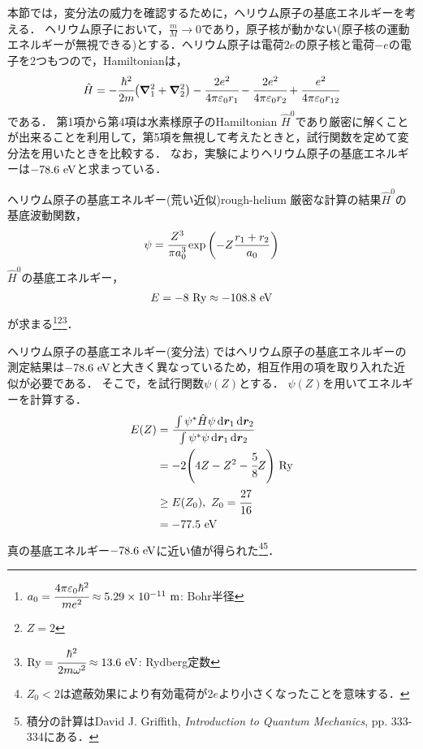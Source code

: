 \documentclass{report}
\begin{document}
  本節では，変分法の威力を確認するために，ヘリウム原子の基底エネルギーを考える．
  ヘリウム原子において，$\frac{m}{M}\to 0$であり，原子核が動かない(原子核の運動エネルギーが無視できる)とする．ヘリウム原子は電荷$2e$の原子核と電荷$-e$の電子を2つもつので，Hamiltonianは，
    \begin{align}
      \hat{H} = -\cfrac{\hbar^2}{2m}\qty(\grad_{1}^{2} + \grad_{2}^{2}) - \cfrac{2e^2}{4\pi \varepsilon_0 r_1}-\cfrac{2e^2}{4\pi \varepsilon_0 r_2} + \cfrac{e^2}{4\pi \varepsilon_0 r_{12}}
    \end{align}
    である．
    第1項から第4項は水素様原子のHamiltonian $\hat{H}^0$であり厳密に解くことが出来ることを利用して，第5項を無視して考えたときと，試行関数を定めて変分法を用いたときを比較する．
    なお，実験によりヘリウム原子の基底エネルギーは$-78.6\ \r{eV}$と求まっている．
  \begin{myex}{ヘリウム原子の基底エネルギー(荒い近似)}{rough-helium}
    厳密な計算の結果$\hat{H}^0$の基底波動関数，
    \begin{align}
      \psi = \cfrac{Z^3}{\pi a_0^3}\exp\qty(-Z\frac{r_1 + r_2}{a_0})\label{helium}
    \end{align}
    $\hat{H}^0$の基底エネルギー，
    \begin{align}
      E = -8\ \mathrm{Ry}\approx -108.8\ \mathrm{eV}
    \end{align}
    が求まる\footnote{
      $a_0 = \cfrac{4\pi\epsilon_0\hbar^2}{me^2} \approx 5.29\times 10^{-11}\ \r{m}$: Bohr半径
    }\footnote{
      $Z = 2$
    }\footnote{
      $\mathrm{Ry} = \cfrac{\hbar^2}{2m\omega^2} \approx 13.6 \ \mathrm{eV}$: Rydberg定数
    }．
  \end{myex}
  \begin{myex}{ヘリウム原子の基底エネルギー(変分法)}{}
    ではヘリウム原子の基底エネルギーの測定結果は$-78.6\ \r{eV}$と大きく異なっているため，相互作用の項を取り入れた近似が必要である．
    そこで，を試行関数$\psi(Z)$とする．
    $\psi(Z)$を用いてエネルギーを計算する．
    \begin{align}
      E(Z) &= \cfrac{\int\psi^{*}\hat{H}\psi \dd{\bm{r}_1}\dd{\bm{r}_2}}{\int\psi^{*}\psi \dd{\bm{r}_1}\dd{\bm{r}_2}} \\
      &= -2\qty(4Z - Z^2 - \cfrac{5}{8}Z)\ \mathrm{Ry}\\ 
      &\geq E\qty(Z_0),\ Z_0 = \cfrac{27}{16}\\
      &=-77.5\ \mathrm{eV}
    \end{align}
    真の基底エネルギー$-78.6\ \r{eV}$に近い値が得られた\footnote{
      $Z_0 < 2$は遮蔽効果により有効電荷が$2e$より小さくなったことを意味する．
    }\footnote{
      積分の計算はDavid J. Griffith, \textit{Introduction to Quantum Mechanics}, pp. 333-334にある．
    }．
  \end{myex}
\end{document}
